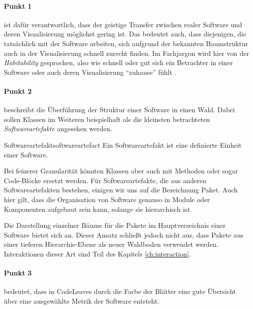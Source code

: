 
\paragraph{Punkt 1} ist dafür verantwortlich, dass der geistige Transfer zwischen realer Software und deren Visualisierung möglichst gering ist. Das bedeutet auch, dass diejenigen, die tatsächlich mit der Software arbeiten, sich aufgrund der bekannten Baumstruktur auch in der Visualisierung schnell zurecht finden. Im Fachjargon wird hier von der \emph{Habitability} gesprochen, also wie schnell oder gut sich ein Betrachter in einer Software oder auch deren Visualisierung "`zuhause"' fühlt \cite{wettel2007program}.

\paragraph{Punkt 2} beschreibt die Überführung der Struktur einer Software in einen Wald. Dabei sollen Klassen im Weiteren beispielhaft als die kleinsten betrachteten \textit{Softwareartefakte} angesehen werden.

\begin{defbox}{Softwareartefakt}{softwareartefact}
  Ein Softwareartefakt ist eine definierte Einheit einer Software.
\end{defbox}

Bei feinerer Granularität könnten Klassen aber auch mit Methoden oder sogar Code-Blöcke ersetzt werden. Für Softwareartefakte, die aus anderen Softwareartefakten bestehen, einigen wir uns auf die Bezeichnung Paket. Auch hier gilt, dass die Organisation von Software genauso in Module oder Komponenten aufgebaut sein kann, solange sie hierarchisch ist.
 
Die Darstellung einzelner Bäume für die Pakete im Hauptverzeichnis einer Software bietet sich an. Dieser Ansatz schließt jedoch nicht aus, dass Pakete aus einer tieferen Hierarchie-Ebene als neuer Waldboden verwendet werden. Interaktionen dieser Art sind Teil des Kapitels \ref{ch:interaction}. 

\paragraph{Punkt 3} bedeutet, dass in CodeLeaves durch die Farbe der Blätter eine gute Übersicht über eine ausgewählte Metrik der Software entsteht.

